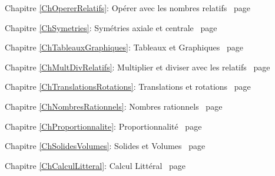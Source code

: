 \begin{commentaire}

\textcolor{PartieFonction}{\PrerequisTitleFont 
Chapitre \ref{ChOpererRelatifs}: Opérer avec les nombres relatifs \dotfill\ page \pageref{ChOpererRelatifs}}

\vspace{2em}

\textcolor{PartieGeometrie}{\PrerequisTitleFont 
Chapitre \ref{ChSymetries}: Symétries axiale et centrale \dotfill\ page \pageref{ChSymetries}}

\vspace{2em}

\textcolor{PartieFonction}{\PrerequisTitleFont 
Chapitre \ref{ChTableauxGraphiques}: Tableaux et Graphiques \dotfill\ page \pageref{ChTableauxGraphiques}}

\vspace{2em}

\textcolor{PartieFonction}{\PrerequisTitleFont 
Chapitre \ref{ChMultDivRelatifs}: Multiplier et diviser avec les relatifs \dotfill\ page \pageref{ChMultDivRelatifs}}

\vspace{2em}

\textcolor{PartieGeometrie}{\PrerequisTitleFont 
Chapitre \ref{ChTranslationsRotations}: Translations et rotations \dotfill\ page \pageref{ChTranslationsRotations}}

\vspace{2em}

\textcolor{PartieFonction}{\PrerequisTitleFont 
Chapitre \ref{ChNombresRationnels}: Nombres rationnels \dotfill\ page \pageref{ChNombresRationnels}}

\vspace{2em}

\textcolor{PartieFonction}{\PrerequisTitleFont 
Chapitre \ref{ChProportionnalite}: Proportionnalité \dotfill\ page \pageref{ChProportionnalite}}

\vspace{2em}

\textcolor{PartieGeometrie}{\PrerequisTitleFont 
Chapitre \ref{ChSolidesVolumes}: Solides et Volumes \dotfill\ page \pageref{ChSolidesVolumes}}

\vspace{2em}

\textcolor{PartieFonction}{\PrerequisTitleFont 
Chapitre \ref{ChCalculLitteral}: Calcul Littéral \dotfill\ page \pageref{ChCalculLitteral}}

\vspace{2em}

\end{commentaire}
